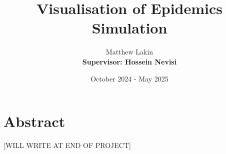 \documentclass{report}
\title{Visualisation of Epidemics Simulation}
\author{Matthew Lakin\\\textbf{Supervisor: Hossein Nevisi}}
\date{October 2024 - May 2025}
\begin{document}
\maketitle
\newpage

\tableofcontents


\newpage

\chapter{Abstract}
[WILL WRITE AT END OF PROJECT]

\newpage





\end{document}
